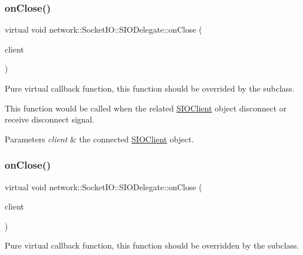 \subsubsection{\texorpdfstring{on\+Close()}{onClose()}\hspace{0.1cm}{\footnotesize\ttfamily [1/2]}}
{\footnotesize\ttfamily virtual void network\+::\+Socket\+I\+O\+::\+S\+I\+O\+Delegate\+::on\+Close (\begin{DoxyParamCaption}\item[{\hyperlink{classnetwork_1_1SIOClient}{S\+I\+O\+Client} $\ast$}]{client }\end{DoxyParamCaption})\hspace{0.3cm}{\ttfamily [pure virtual]}}

Pure virtual callback function, this function should be overrided by the subclass.

This function would be called when the related \hyperlink{classnetwork_1_1SIOClient}{S\+I\+O\+Client} object disconnect or receive disconnect signal.


\begin{DoxyParams}{Parameters}
{\em client} & the connected \hyperlink{classnetwork_1_1SIOClient}{S\+I\+O\+Client} object. \\
\hline
\end{DoxyParams}
\mbox{\label{classnetwork_1_1SocketIO_1_1SIODelegate_ac70f5e19ee755ac6dbc608018e2176f4}} 
\subsubsection{\texorpdfstring{on\+Close()}{onClose()}\hspace{0.1cm}{\footnotesize\ttfamily [2/2]}}
{\footnotesize\ttfamily virtual void network\+::\+Socket\+I\+O\+::\+S\+I\+O\+Delegate\+::on\+Close (\begin{DoxyParamCaption}\item[{\hyperlink{classnetwork_1_1SIOClient}{S\+I\+O\+Client} $\ast$}]{client }\end{DoxyParamCaption})\hspace{0.3cm}{\ttfamily [pure virtual]}}

Pure virtual callback function, this function should be overridden by the subclass.

